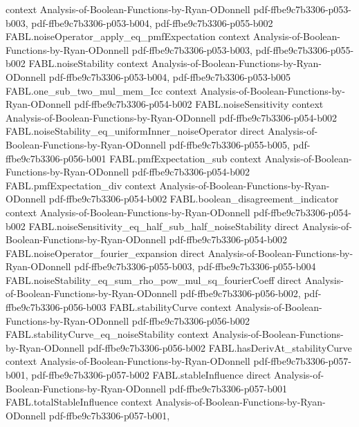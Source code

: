 \begin{theorem}
  {context}
  {Analysis-of-Boolean-Functions-by-Ryan-ODonnell}
  {pdf-ffbe9c7b3306-p053-b003,
    pdf-ffbe9c7b3306-p053-b004,
    pdf-ffbe9c7b3306-p055-b002}
\proofstep
  {FABL.noiseOperator_apply_eq_pmfExpectation}
  {context}
  {Analysis-of-Boolean-Functions-by-Ryan-ODonnell}
  {pdf-ffbe9c7b3306-p053-b003,
    pdf-ffbe9c7b3306-p055-b002}
\proofstep
  {FABL.noiseStability}
  {context}
  {Analysis-of-Boolean-Functions-by-Ryan-ODonnell}
  {pdf-ffbe9c7b3306-p053-b004,
    pdf-ffbe9c7b3306-p053-b005}
\proofstep
  {FABL.one_sub_two_mul_mem_Icc}
  {context}
  {Analysis-of-Boolean-Functions-by-Ryan-ODonnell}
  {pdf-ffbe9c7b3306-p054-b002}
\proofstep
  {FABL.noiseSensitivity}
  {context}
  {Analysis-of-Boolean-Functions-by-Ryan-ODonnell}
  {pdf-ffbe9c7b3306-p054-b002}
\proofstep
  {FABL.noiseStability_eq_uniformInner_noiseOperator}
  {direct}
  {Analysis-of-Boolean-Functions-by-Ryan-ODonnell}
  {pdf-ffbe9c7b3306-p055-b005,
    pdf-ffbe9c7b3306-p056-b001}
\proofstep
  {FABL.pmfExpectation_sub}
  {context}
  {Analysis-of-Boolean-Functions-by-Ryan-ODonnell}
  {pdf-ffbe9c7b3306-p054-b002}
\proofstep
  {FABL.pmfExpectation_div}
  {context}
  {Analysis-of-Boolean-Functions-by-Ryan-ODonnell}
  {pdf-ffbe9c7b3306-p054-b002}
\proofstep
  {FABL.boolean_disagreement_indicator}
  {context}
  {Analysis-of-Boolean-Functions-by-Ryan-ODonnell}
  {pdf-ffbe9c7b3306-p054-b002}
\proofstep
  {FABL.noiseSensitivity_eq_half_sub_half_noiseStability}
  {direct}
  {Analysis-of-Boolean-Functions-by-Ryan-ODonnell}
  {pdf-ffbe9c7b3306-p054-b002}
\proofstep
  {FABL.noiseOperator_fourier_expansion}
  {direct}
  {Analysis-of-Boolean-Functions-by-Ryan-ODonnell}
  {pdf-ffbe9c7b3306-p055-b003,
    pdf-ffbe9c7b3306-p055-b004}
\proofstep
  {FABL.noiseStability_eq_sum_rho_pow_mul_sq_fourierCoeff}
  {direct}
  {Analysis-of-Boolean-Functions-by-Ryan-ODonnell}
  {pdf-ffbe9c7b3306-p056-b002,
    pdf-ffbe9c7b3306-p056-b003}
\proofstep
  {FABL.stabilityCurve}
  {context}
  {Analysis-of-Boolean-Functions-by-Ryan-ODonnell}
  {pdf-ffbe9c7b3306-p056-b002}
\proofstep
  {FABL.stabilityCurve_eq_noiseStability}
  {context}
  {Analysis-of-Boolean-Functions-by-Ryan-ODonnell}
  {pdf-ffbe9c7b3306-p056-b002}
\proofstep
  {FABL.hasDerivAt_stabilityCurve}
  {context}
  {Analysis-of-Boolean-Functions-by-Ryan-ODonnell}
  {pdf-ffbe9c7b3306-p057-b001,
    pdf-ffbe9c7b3306-p057-b002}
\proofstep
  {FABL.stableInfluence}
  {direct}
  {Analysis-of-Boolean-Functions-by-Ryan-ODonnell}
  {pdf-ffbe9c7b3306-p057-b001}
\proofstep
  {FABL.totalStableInfluence}
  {context}
  {Analysis-of-Boolean-Functions-by-Ryan-ODonnell}
  {pdf-ffbe9c7b3306-p057-b001,
}
\end{theorem}
